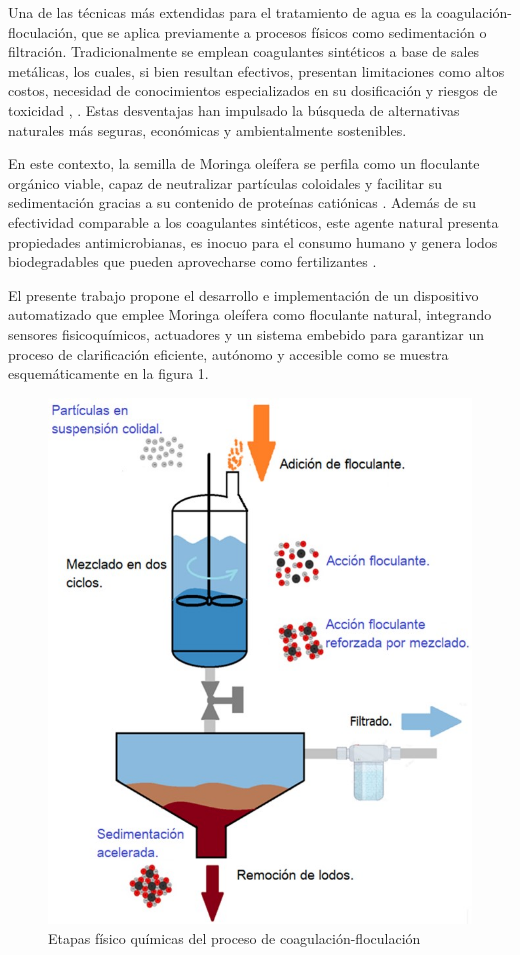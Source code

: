 \documentclass[conference]{IEEEtran}
\begin{document}
	Una de las técnicas más extendidas para el tratamiento de agua es la coagulación-floculación, que se aplica previamente a procesos físicos como sedimentación o filtración. Tradicionalmente se emplean coagulantes sintéticos a base de sales metálicas, los cuales, si bien resultan efectivos, presentan limitaciones como altos costos, necesidad de conocimientos especializados en su dosificación y riesgos de toxicidad \cite{b2}, \cite{b3}. Estas desventajas han impulsado la búsqueda de alternativas naturales más seguras, económicas y ambientalmente sostenibles.
	
	En este contexto, la semilla de Moringa oleífera se perfila como un floculante orgánico viable, capaz de neutralizar partículas coloidales y facilitar su sedimentación gracias a su contenido de proteínas catiónicas \cite{b4}. Además de su efectividad comparable a los coagulantes sintéticos, este agente natural presenta propiedades antimicrobianas, es inocuo para el consumo humano y genera lodos biodegradables que pueden aprovecharse como fertilizantes \cite{b5}.
	
	El presente trabajo propone el desarrollo e implementación de un dispositivo automatizado que emplee Moringa oleífera como floculante natural, integrando sensores fisicoquímicos, actuadores y un sistema embebido para garantizar un proceso de clarificación eficiente, autónomo y accesible como se muestra esquemáticamente en la figura 1.
	
	\begin{figure}[htbp]
		\centering
		\includegraphics[width=\columnwidth]{fig1.jpg}
		\caption{Etapas físico químicas del proceso de coagulación-floculación}
		\label{fig:esquema-sistema}
	\end{figure}
	
\end{document}
